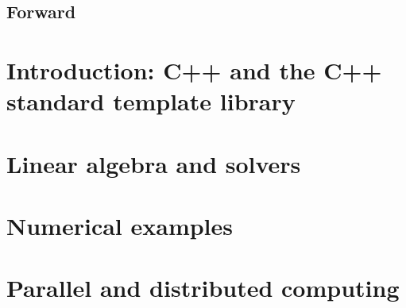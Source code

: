 \documentclass[11pt,fleqn]{book} %
\begin{document}
\tableofcontents %

\cleardoublepage %

\pagestyle{fancy} %

\chapter*{Forward}


\part{Introduction: C++ and the C++ standard template library}


%

\part{Linear algebra and solvers}

%

\part{Numerical examples}
\label{part:numerical:examples}

%

\part{Parallel and distributed computing}
\end{document}
